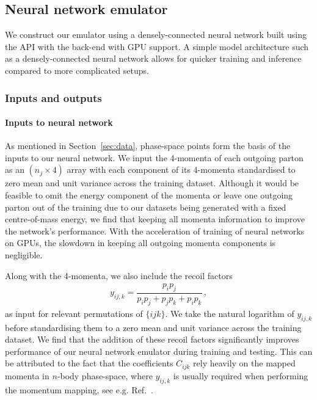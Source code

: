 \documentclass[main.tex]{subfiles}
\begin{document}
\subsection{Neural network emulator}\label{sec:network}
We construct our emulator using a densely-connected neural network built using the {\Keras} API \cite{chollet2015keras} with the {\TensorFlow} back-end \cite{tensorflow2015-whitepaper} with GPU support. A simple model architecture such as a densely-connected neural network allows for quicker training and inference compared to more complicated setups.
\subsubsection{Inputs and outputs}\label{sec:input_outputs}
\paragraph*{Inputs to neural network}
As mentioned in Section~\ref{sec:data}, phase-space points form the basis of the inputs to our neural network.
We input the 4-momenta of each outgoing parton as an $(n_{j} \times 4)$ array with each component of its 4-momenta standardised to zero mean and unit variance across the training dataset.
Although it would be feasible to omit the energy component of the momenta or leave one outgoing parton out of the training due to our datasets being generated with a fixed centre-of-mass energy, 
we find that keeping all momenta information to improve the network's performance.
With the acceleration of training of neural networks on GPUs, the slowdown in keeping all outgoing momenta components is negligible.

Along with the 4-momenta, we also include the recoil factors
\begin{eqnarray}\label{eq:recoil_factor}
    y_{ij,k} = \dfrac{p_{i}p_{j}}{p_{i}p_{j} + p_{j}p_{k} + p_{i}p_{k}} \, ,
\end{eqnarray}
as input for relevant permutations of $\{ijk\}$.
We take the natural logarithm of $y_{ij,k}$ before standardising them to a zero mean and unit variance across the training dataset.
We find that the addition of these recoil factors significantly improves performance of our neural network emulator during training and testing.
This can be attributed to the fact that the coefficients $C_{ijk}$ rely heavily on the mapped momenta in $n$-body phase-space, where $y_{ij,k}$ is usually required when performing the momentum mapping, see e.g. Ref.~\cite{Catani:1996vz}.
\end{document}
